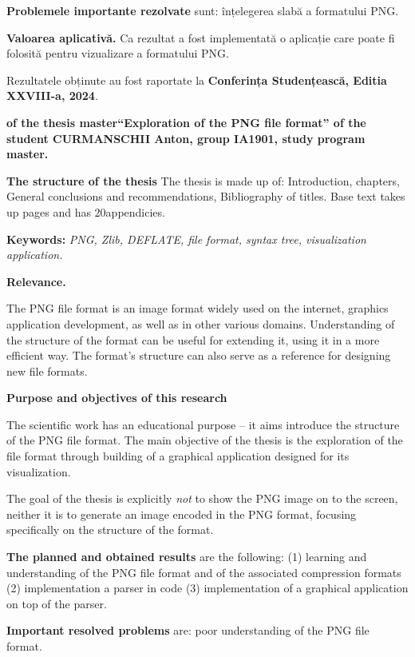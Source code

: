 \documentclass[a4paper,12pt]{report}
\newcommand{\authorName}{CURMANSCHII Anton}
\newcommand{\thesisTitleEng}{Exploration of the PNG file format}
\newcommand{\uniGroupName}{IA1901}
\newcommand{\thesisType}{master}
\newcommand{\programulDeStudii}{master}
\newcommand{\anexeCount}{20}
\newcommand{\conferencesList}{Conferința Studențească, Editia XXVIII-a, 2024}
\begin{document}
\textbf{Problemele importante rezolvate} sunt: înțelegerea slabă a formatului \ac{PNG}.

\textbf{Valoarea aplicativă.} Ca rezultat a fost implementată o aplicație care poate fi folosită pentru vizualizare a formatului \ac{PNG}.

Rezultatele obținute au fost raportate la \textbf{\conferencesList}.

\clearpage
{}

\textbf{of the thesis \thesisType ``\thesisTitleEng'' of the student \authorName{}, group \uniGroupName, study program \programulDeStudii.}

\textbf{The structure of the thesis}
The thesis is made up of: Introduction,  chapters,
General conclusions and recommendations, Bibliography of \bibliographyEntryCount{} titles.
Base text takes up \usefulPageCount{} pages and has \anexeCount appendicies.

\textbf{Keywords:}
\textit{\ac{PNG}, Zlib, DEFLATE, file format, syntax tree, visualization application.}

\textbf{Relevance.}

The \ac{PNG} file format is an image format widely used on the internet,
graphics application development, as well as in other various domains.
Understanding of the structure of the format can be useful for extending it,
using it in a more efficient way.
The format's structure can also serve as a reference for designing new file formats.

\textbf{Purpose and objectives of this research}

The scientific work has an educational purpose
-- it aims introduce the structure of the \ac{PNG} file format.
The main objective of the thesis is the exploration of the file format
through building of a graphical application designed for its visualization.

The goal of the thesis is explicitly \textit{not} to show the \ac{PNG} image on to the screen,
neither it is to generate an image encoded in the \ac{PNG} format, focusing specifically
on the structure of the format.

\textbf{The planned and obtained results} are the following:
(1) learning and understanding of the \ac{PNG} file format and of the associated compression formats
(2) implementation a parser in code
(3) implementation of a graphical application on top of the parser.

\textbf{Important resolved problems} are: poor understanding of the \ac{PNG} file format.
\end{document}
